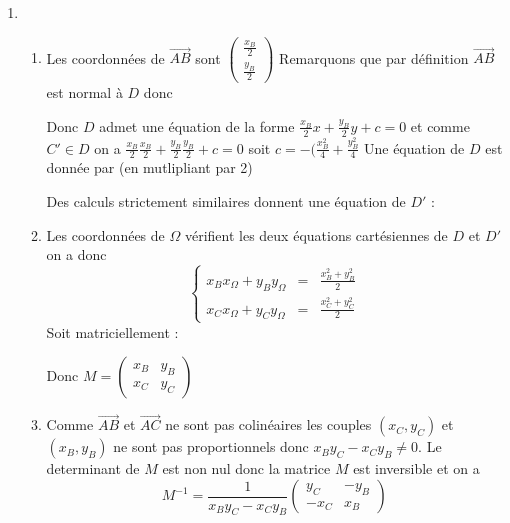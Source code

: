 \documentclass[a4paper, 11pt,reqno]{article}
\newcommand\vv[1]{\overrightarrow{#1}}
\begin{document}
\begin{correction}
\begin{enumerate}
\begin{enumerate}

\end{enumerate}
\item \begin{enumerate}
\item Les coordonnées de $\vv{AB} $ sont $\begin{pmatrix}
 \frac{x_B}{2} \\ 
 \frac{y_B}{2}
\end{pmatrix}$
Remarquons que par définition  $\vv{AB}$ est normal à $D$ donc 

Donc $D$ admet une équation de la forme $\frac{x_B}{2}
x +\frac{y_B}{2}y + c=0$ et comme $C'\in D$ on a 
$\frac{x_B}{2}\frac{x_B}{2}+\frac{y_B}{2}\frac{y_B}{2} +c=0$ soit 
$c= -(\frac{x_B^2}{4}+\frac{y_B^2}{4}$
Une équation de $D$ est donnée par  (en mutlipliant par 2)

Des calculs strictement similaires donnent une équation de $D'$ :

\item Les coordonnées de $\Omega$ vérifient les deux équations cartésiennes de $D$ et $D'$ on a donc 
$$\left\{ \begin{array}{ccc}
x_B x_\Omega +y_B y_\Omega &=&\frac{x_B^2+y_B^2}{2}\\
x_C x_\Omega +y_C y_\Omega &=&\frac{x_C^2+y_C^2}{2}
\end{array}\right.$$
Soit matriciellement : 



Donc $M=\begin{pmatrix}
x_B & y_B\\
x_C & y_C
\end{pmatrix} $ 

\item Comme $\vv{AB}$ et $\vv{AC}$ ne sont pas colinéaires 
les couples $(x_C,y_C) $ et $(x_B,y_B)$ ne sont pas proportionnels donc $x_By_C -x_Cy_B\neq 0$. Le determinant de $M$ est non nul donc la matrice $M$ est inversible et on a 
$$M^{-1} = \frac{1}{x_By_C -x_Cy_B }\begin{pmatrix}
y_C & -y_B\\
-x_C & x_B
\end{pmatrix}$$


\end{enumerate}
\end{enumerate}
\end{correction}
\end{document}
